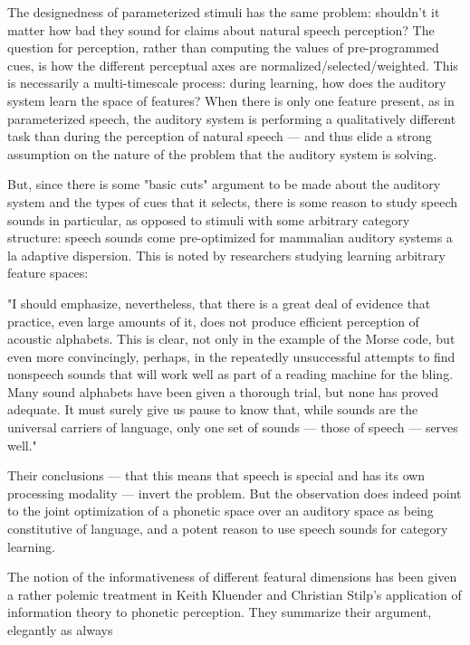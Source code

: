 The designedness of parameterized stimuli has the same problem: shouldn't it matter how bad they sound for claims about natural speech perception? The question for perception, rather than computing the values of pre-programmed cues, is how the different perceptual axes are normalized/selected/weighted. This is necessarily a multi-timescale process: during learning, how does the auditory system learn the space of features? When there is only one feature present, as in parameterized speech, the auditory system is performing a qualitatively different task than during the perception of natural speech --- and thus elide a strong assumption on the nature of the problem that the auditory system is solving. 

But, since there is some "basic cuts" argument to be made about the auditory system and the types of cues that it selects, there is some reason to study speech sounds in particular, as opposed to stimuli with some arbitrary category structure: speech sounds come pre-optimized for mammalian auditory systems a la adaptive dispersion. This is noted by researchers studying learning arbitrary feature spaces:

\begin{leftbar}
"I should emphasize, nevertheless, that there is a great deal of evidence that practice, even large amounts of it, does not produce efficient perception of acoustic alphabets. This is clear, not only in the example of the Morse code, but even more convincingly, perhaps, in the repeatedly unsuccessful attempts to find nonspeech sounds that will work well as part of a reading machine for the bling. Many sound alphabets have been given a thorough trial, but none has proved adequate. It must surely give us pause to know that, while sounds are the universal carriers of language, only one set of sounds --- those of speech --- serves well."\citep{libermanCharacteristicsPerceptionSpeech1970}
\end{leftbar}

Their conclusions --- that this means that speech is special and has its own processing modality --- invert the problem. But the observation does indeed point to the joint optimization of a phonetic space over an auditory space as being constitutive of language, and a potent reason to use speech sounds for category learning.

The notion of the informativeness of different featural dimensions has been given a rather polemic treatment in Keith Kluender and Christian Stilp's application of information theory to phonetic perception\citep{kluenderLongstandingProblemsSpeech2019,kluenderPerceptionVowelSounds2013,stilpEfficientCodingStatistically2012,stilpRapidEfficientCoding2010}. They summarize their argument, elegantly as always

